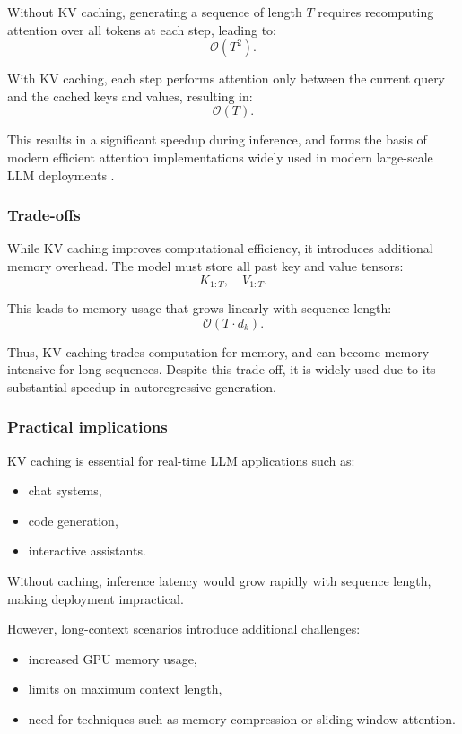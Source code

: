\documentclass{article}
\begin{document}
Without KV caching, generating a sequence of length $T$ requires recomputing attention over all tokens at each step, leading to:
\[
\mathcal{O}(T^2).
\]

With KV caching, each step performs attention only between the current query and the cached keys and values, resulting in:
\[
\mathcal{O}(T).
\]

This results in a significant speedup during inference, and forms the basis of modern efficient attention implementations widely used in modern large-scale LLM deployments \cite{brown2020gpt3}.

\subsubsection{Trade-offs}

While KV caching improves computational efficiency, it introduces additional memory overhead. The model must store all past key and value tensors:
\[
K_{1:T}, \quad V_{1:T}.
\]

This leads to memory usage that grows linearly with sequence length:
\[
\mathcal{O}(T \cdot d_k).
\]

Thus, KV caching trades computation for memory, and can become memory-intensive for long sequences. Despite this trade-off, it is widely used due to its substantial speedup in autoregressive generation.

\subsubsection{Practical implications}

KV caching is essential for real-time LLM applications such as:
\begin{itemize}
    \item chat systems,
    \item code generation,
    \item interactive assistants.
\end{itemize}

Without caching, inference latency would grow rapidly with sequence length, making deployment impractical.

However, long-context scenarios introduce additional challenges:
\begin{itemize}
    \item increased GPU memory usage,
    \item limits on maximum context length,
    \item need for techniques such as memory compression or sliding-window attention.
\end{itemize}
\end{document}
